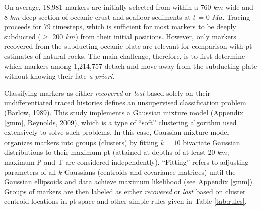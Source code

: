 On average, 18,981 markers are initially selected from within a 760 \(km\) wide and 8 \(km\) deep section of oceanic crust and seafloor sediments at \(t\) = 0 \(Ma\). Tracing proceeds for 79 timesteps, which is sufficient for most markers to be deeply subducted (\(\geq\) 200 \(km\)) from their initial positions. However, only markers recovered from the subducting oceanic-plate are relevant for comparison with \gls{pt} estimates of natural rocks. The main challenge, therefore, is to first determine which markers among 1,214,757 detach and move away from the subducting plate without knowing their fate \emph{a priori}.

Classifying markers as either \emph{recovered} or \emph{lost} based solely on their undifferentiated traced histories defines an unsupervised classification problem (\protect\hyperlink{ref-barlow1989}{Barlow, 1989}). This study implements a Gaussian mixture model (Appendix \ref{gmm}, \protect\hyperlink{ref-reynolds2009}{Reynolds, 2009}), which is a type of ``soft'' clustering algorithm used extensively to solve such problems. In this case, Gaussian mixture model organizes markers into groups (clusters) by fitting \(k=10\) bivariate Gaussian distributions to their maximum \gls{pt} (attained at depths of at least 20 \(km\); maximum P and T are considered independently). ``Fitting'' refers to adjusting parameters of all \(k\) Gaussians (centroids and covariance matrices) until the Gaussian ellipsoids and data achieve maximum likelihood (see Appendix \ref{gmm}). Groups of markers are then labeled as either \emph{recovered} or \emph{lost} based on cluster centroid locations in \gls{pt} space and other simple rules given in Table \ref{tab:rules}.

